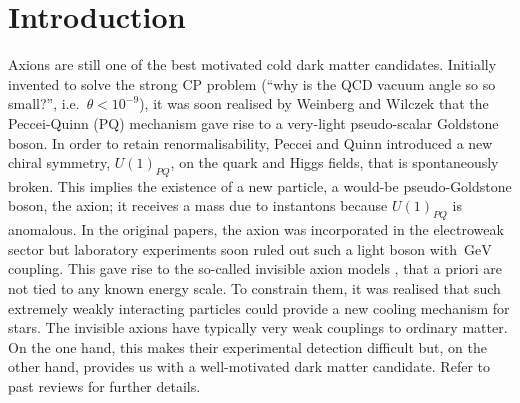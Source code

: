 \documentclass[preprint,nofootinbib]{revtex4}
\newcommand{\units}[1]{\, \mathrm{#1}}
\begin{document}
\maketitle

\section{Introduction}
\label{sec:introduction}

Axions are still one of the best motivated cold dark matter candidates. Initially invented to solve the strong CP problem (``why is the QCD vacuum angle so so small?'', i.e.\ $\theta<10^{-9}$), it was soon realised by Weinberg \cite{weinberg:axion} and Wilczek \cite{wilczek:axion} that the Peccei-Quinn (PQ) mechanism \cite{peccei:quinn:cp1,peccei:quinn:cp2} gave rise to a very-light pseudo-scalar Goldstone boson. In order to retain renormalisability, Peccei and Quinn introduced a new chiral symmetry, $U(1)_{PQ}$, on the quark and Higgs fields, that is spontaneously broken. This implies the existence of a new particle, a would-be pseudo-Goldstone boson, the axion; it receives a mass due to instantons because $U(1)_{PQ}$ is anomalous. In the original papers, the axion was incorporated in the electroweak sector but laboratory experiments soon ruled out such a light boson with $\units{GeV}$ coupling. This gave rise to the so-called invisible axion models \cite{shifman:vainshtein:zakharov:cp,kim:axion,dine:fischler:srednicki:axion,zhitnitsky:axion}, that a priori are not tied to any known energy scale. To constrain them, it was realised that such extremely weakly interacting particles could provide a new cooling mechanism for stars. The invisible axions have typically very weak couplings to ordinary matter. On the one hand, this makes their experimental detection difficult but, on the other hand, provides us with a well-motivated dark matter candidate. Refer to past reviews \cite{kim:report,cheng:strongCP:report,turner:axion:report} for further details.
\end{document}
